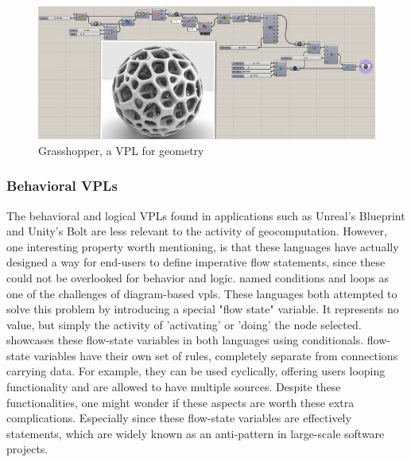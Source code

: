 \begin{figure}
  \centering
  \graphicspath{{../../assets/images/3/}}
  \includegraphics[width=\linewidth]{grasshopper.jpg}
  \caption[Geometry VPL]{Grasshopper, a VPL for geometry \citep{rutten_grasshopper_2012}}
  \label{fig:geo-vpl}
\end{figure}

\subsubsection*{Behavioral VPLs}
The behavioral and logical VPLs found in applications such as Unreal's Blueprint \citep{epic_games_blueprints_2022} and Unity's Bolt \citep{unity_technologies_bolt_2021} are less relevant to the activity of geocomputation.
However, one interesting property worth mentioning, is that these languages have actually designed a way for end-users to define imperative flow statements, since these could not be overlooked for behavior and logic.
 named conditions and loops as one of the challenges of diagram-based vpls. 
These languages both attempted to solve this problem by introducing a special "flow state" variable. 
It represents no value, but simply the activity of 'activating' or 'doing' the node selected. 
 showcases these flow-state variables in both languages using conditionals.
flow-state variables have their own set of rules, completely separate from connections carrying data. 
For example, they can be used cyclically, offering users looping functionality and are allowed to have multiple sources.  
Despite these functionalities, one might wonder if these aspects are worth these extra complications.
Especially since these flow-state variables are effectively  statements, which are widely known as an anti-pattern in large-scale software projects. 

